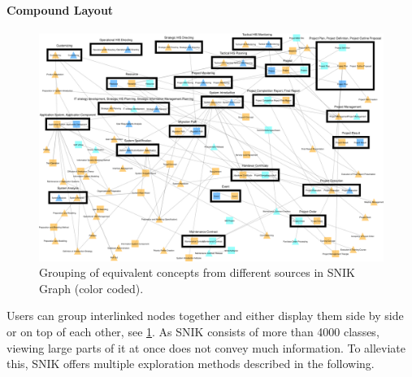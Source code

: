 \documentclass[conference]{IEEEtran}
\begin{document}
\paragraph{Compound Layout}
\begin{figure}[h]
    \centering
    \includegraphics[width=\columnwidth]{img/combine.pdf}
    \caption{Grouping of equivalent concepts from different sources in SNIK Graph (color coded).}%
	\label{fig:combine}
\end{figure}
\vspace{-3pt}

Users can group interlinked nodes together and either display them side by side or on top of each other, see \cref{fig:combine}.
As SNIK consists of more than 4000 classes, viewing large parts of it at once does not convey much information.%
To alleviate this, SNIK offers multiple exploration methods described in the following.
\end{document}
